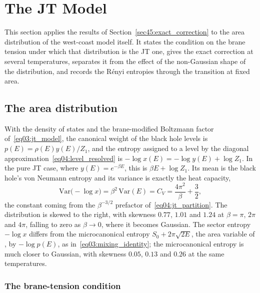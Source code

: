 \documentclass[11pt,letterpaper]{article}
\theoremstyle{plain}
\theoremstyle{definition}
\theoremstyle{remark}
\begin{document}
\section{The JT Model}
\label{sec05:exact_jt}

This section applies the results of Section~\ref{sec45:exact_correction} to the area distribution of the west-coast model itself. It states the condition on the brane tension under which that distribution is the JT one, gives the exact correction at several temperatures, separates it from the effect of the non-Gaussian shape of the distribution, and records the R\'enyi entropies through the transition at fixed area.

\subsection{The area distribution}
\label{subsec05:entropy_distribution}

With the density of states and the brane-modified Boltzmann factor of~\eqref{eq03:jt_model}, the canonical weight of the black hole levels is $p(E) = \rho(E)y(E)/Z_1$, and the entropy assigned to a level by the diagonal approximation~\eqref{eq04:level_resolved} is $-\log x(E) = -\log y(E) + \log Z_1$. In the pure JT case, where $y(E) = e^{-\beta E}$, this is $\beta E + \log Z_1$. Its mean is the black hole's von Neumann entropy and its variance is exactly the heat capacity,
\begin{equation}
\label{eq05:sigma_eff}
\mathrm{Var}\big(-\log x\big) = \beta^2\,\mathrm{Var}(E) = C_V = \frac{4\pi^2}{\beta} + \frac32 ,
\end{equation}
the constant coming from the $\beta^{-3/2}$ prefactor of~\eqref{eq04:jt_partition}. The distribution is skewed to the right, with skewness $0.77$, $1.01$ and $1.24$ at $\beta = \pi$, $2\pi$ and $4\pi$, falling to zero as $\beta \to 0$, where it becomes Gaussian. The sector entropy $-\log x$ differs from the microcanonical entropy $S_0 + 2\pi\sqrt{2E}$, the area variable of \citet{marolfwangwang2020}, by $-\log p(E)$, as in~\eqref{eq03:mixing_identity}; the microcanonical entropy is much closer to Gaussian, with skewness $0.05$, $0.13$ and $0.26$ at the same temperatures.

\subsubsection*{The brane-tension condition}
\end{document}

